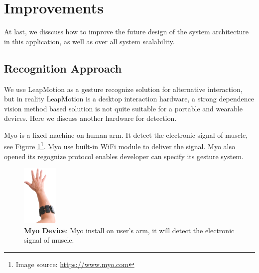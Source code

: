 \section{Improvements}

At last, we disscuss how to improve the future design of the system architecture in this application, as well as over all system scalability.

\subsection{Recognition Approach}

We use LeapMotion as a gesture recognize solution for alternative interaction, but in reality LeapMotion is a desktop interaction hardware, a strong dependence vision method based solution is not quite suitable for a portable and wearable devices. Here we discuss another hardware for detection.

Myo \cite{Myo:2016} is a fixed machine on human arm. It detect the electronic signal of muscle, see Figure \ref{fig:myo}\footnote{Image source: \url{https://www.myo.com}}. Myo use built-in WiFi module to deliver the signal. Myo also opened its regognize protocol enables developer can specify its gesture system.

\begin{figure}[H]
    \kaishu
    \centering
    \includegraphics[width=0.15\textwidth]{figures/myo}
    \caption{\kaishu \textbf{Myo Device}: Myo install on user's arm, it will detect the electronic signal of muscle.}
    \label{fig:myo}
\end{figure}

